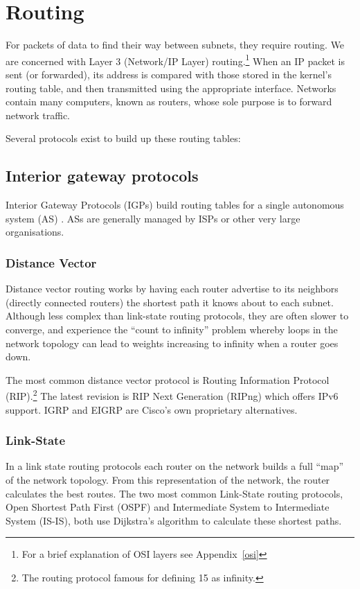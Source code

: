 \documentclass[12pt,a4paper,twoside]{report}
\begin{document}
\section{Routing}
For packets of data to find their way between subnets, they require routing.
We are concerned with Layer 3 (Network/IP Layer) routing.\footnote{For a brief
explanation of OSI layers see Appendix~\ref{osi}} When an IP packet is sent
(or forwarded), its address is compared with those stored in the kernel's
routing table, and then transmitted using the appropriate interface. Networks
contain many computers, known as routers, whose sole purpose is to forward
network traffic.

Several protocols exist to build up these routing tables:

\subsection{Interior gateway protocols}
Interior Gateway Protocols (IGPs)  build routing tables for a single autonomous system (AS)
. ASs are generally managed by ISPs or
other very large organisations.  

\subsubsection{Distance Vector}
Distance vector routing works by having each router advertise to its neighbors
(directly connected routers) the shortest path it knows about to each subnet.
Although less complex than link-state routing protocols, they are often slower
to converge, and experience the ``count to infinity'' problem whereby loops in
the network topology can lead to weights increasing to infinity when a router
goes down. 

The most common distance vector protocol is Routing Information Protocol
(RIP).\footnote{The routing
protocol famous for defining 15 as infinity.} The latest revision is RIP Next
Generation (RIPng) which offers IPv6 support. IGRP and EIGRP are Cisco's own
proprietary alternatives.

\subsubsection{Link-State}
In a link state routing protocols each router on the network builds a full
``map'' of the network topology. From this representation of the network, the
router calculates the best routes. The two most common Link-State routing
protocols, Open Shortest Path First (OSPF)  and Intermediate System to Intermediate System (IS-IS),
 both use
Dijkstra's algorithm to calculate these shortest paths. 
\end{document}
